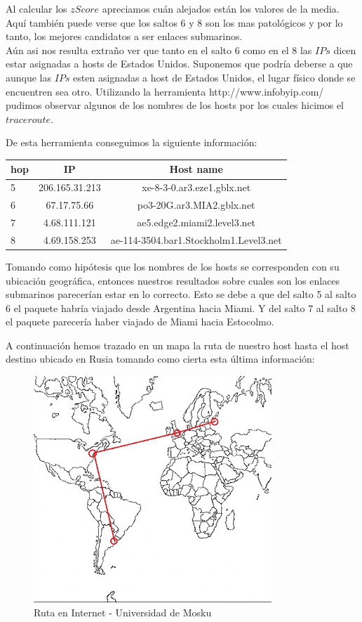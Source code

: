 Al calcular los $zScore$ apreciamos cuán alejados están los valores de la media.
Aquí también puede verse que los saltos 6 y 8 son los mas patológicos y por lo tanto, los mejores candidatos a ser enlaces submarinos.\\

Aún asi nos resulta extraño ver que tanto en el salto 6 como en el 8 las $IPs$ dicen estar asignadas a hosts de Estados Unidos. 
Suponemos que podría deberse a que aunque las $IPs$ esten asignadas a host de Estados Unidos, el lugar físico donde se encuentren sea otro.
Utilizando la herramienta http://www.infobyip.com/ pudimos observar algunos de los nombres de los hosts por los cuales hicimos el $traceroute$.

De esta herramienta conseguimos la siguiente información:\\

\bigskip
\begin{tabular}{| l | c | c |}
\hline 
hop & IP & Host name\\
\hline 
5  &  206.165.31.213  &  xe-8-3-0.ar3.eze1.gblx.net\\
\hline 
6  &  67.17.75.66  &   po3-20G.ar3.MIA2.gblx.net\\
\hline 
7  &  4.68.111.121  & ae5.edge2.miami2.level3.net\\
\hline 
8  &  4.69.158.253  & ae-114-3504.bar1.Stockholm1.Level3.net\\
\hline 
\end{tabular}
\bigskip

Tomando como hipótesis que los nombres de los hosts se corresponden con su ubicación geográfica, entonces nuestros resultados sobre 
cuales son los enlaces submarinos parecerían estar en lo correcto. Esto se debe a que del salto 5 al salto 6 el paquete habría viajado desde Argentina 
hacia Miami. Y del salto 7 al salto 8 el paquete parecería haber viajado de Miami hacia Estocolmo.

A continuación hemos trazado en un mapa la ruta de nuestro host hasta el host destino ubicado en Rusia tomando como cierta esta última información:
\begin{figure}[H]
\centering
\includegraphics[width=0.8\textwidth]{graficos/mapa_rusia.jpg}
\caption{Ruta en Internet - Universidad de Mosku}
\label{rusia_zs}
\end{figure}